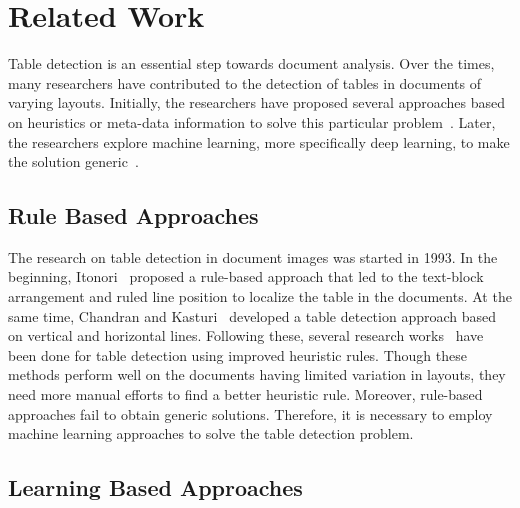 \documentclass[a4paper,conference]{IEEEtran}
\begin{document}
\section{Related Work} \label{Related Work}

Table detection is an essential step towards document analysis. Over the times, many researchers have contributed to the detection of tables in documents of varying layouts. Initially, the researchers have proposed several approaches based on heuristics or meta-data information to solve this particular problem~\cite{Itonori1993TableSR,chandran1993structural,hirayama1995method,green1995recognition,Tupaj96extractingtabular,hu1999medium,gatos2005automatic,shafait2010table}. Later, the researchers explore machine learning, more specifically deep learning, to make the solution generic~\cite{gilani2017table,schreiber2017deepdesrt,siddiqui2018decnt,sun2019faster,vo2018ensemble,arif2018table,li2019tablebank,younas2019ffd,zhong2019publaynet,saha2019graphical,casado2019benefits}. 

\subsection{Rule Based Approaches}

The research on table detection in document images was started in 1993. In the beginning, Itonori~\cite{Itonori1993TableSR} proposed a rule-based approach that led to the text-block arrangement and ruled line position to localize the table in the documents. At the same time, Chandran and Kasturi~\cite{chandran1993structural} developed a table detection approach based on vertical and horizontal lines. Following these, several research works~\cite{hirayama1995method,green1995recognition,Tupaj96extractingtabular,hu1999medium,gatos2005automatic,shafait2010table} have been done for table detection using improved heuristic rules. Though these methods perform well on the documents having limited variation in layouts, they need more manual efforts to find a better heuristic rule. Moreover, rule-based approaches fail to obtain generic solutions. Therefore, it is necessary to employ machine learning approaches to solve the table detection problem.  

\subsection{Learning Based Approaches}
\end{document}
